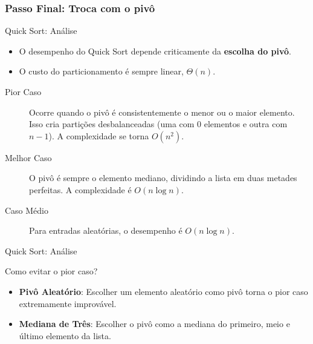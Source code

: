 \documentclass{beamer}
\begin{document}
\begin{frame}[fragile]
\frametitle{Passo Final: Troca com o pivô}
\centering
{}
\end{frame}

\begin{frame}{Quick Sort: Análise}
\begin{itemize}
 \item O desempenho do Quick Sort depende criticamente da \textbf{escolha do pivô}.
 \item O custo do particionamento é sempre linear, $\Theta(n)$.
\end{itemize}
\begin{description}
 \item[Pior Caso] Ocorre quando o pivô é consistentemente o menor ou o maior elemento. Isso cria partições desbalanceadas (uma com 0 elementos e outra com $n-1$). A complexidade se torna $O(n^2)$.
 \item[Melhor Caso] O pivô é sempre o elemento mediano, dividindo a lista em duas metades perfeitas. A complexidade é $O(n \log n)$.
 \item[Caso Médio] Para entradas aleatórias, o desempenho é $O(n \log n)$.
\end{description}

\end{frame}


\begin{frame}{Quick Sort: Análise}

\begin{block}{Como evitar o pior caso?}
 \begin{itemize}
    \item \textbf{Pivô Aleatório}: Escolher um elemento aleatório como pivô torna o pior caso extremamente improvável.
    \item \textbf{Mediana de Três}: Escolher o pivô como a mediana do primeiro, meio e último elemento da lista.
 \end{itemize}
\end{block}
\end{frame}
\end{document}
